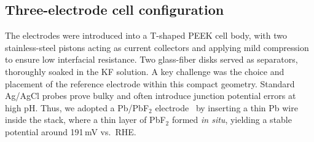 \subsection{Three-electrode cell configuration}




The electrodes were introduced into a T-shaped PEEK cell body, with two stainless-steel pistons acting as current collectors and applying mild compression to ensure low interfacial resistance. Two glass-fiber disks served as separators, thoroughly soaked in the KF solution. A key challenge was the choice and placement of the reference electrode within this compact geometry. Standard Ag/AgCl probes prove bulky and often introduce junction potential errors at high pH. Thus, we adopted a Pb/PbF$_2$ electrode~\cite{pastaLeadFlouride2012,piantaEvaluationKineticParameters2023a} by inserting a thin Pb wire inside the stack, where a thin layer of PbF$_2$ formed \textit{in situ}, yielding a stable potential around 191\,mV vs.\ RHE.



